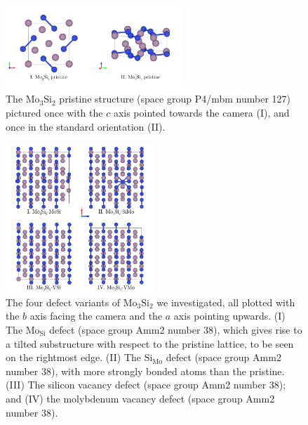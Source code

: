 \documentclass[7.5pt]{article}
\theoremstyle{plain}
\theoremstyle{definition}
\newcommand{\<}{\langle}
\renewcommand{\>}{\rangle}
\begin{document}
\begin{figure}
\label{fig:mat-pristine}
\centering
\includegraphics[width=0.6\textwidth]{img/Mo3Si2-pristine}
\caption{The $\text{Mo}_3\text{Si}_2$ pristine structure (space group P4/mbm number 127) pictured once with the $c$ axis pointed towards the camera (I), and once in the standard orientation (II).}
\end{figure}

\begin{figure}
\label{fig:mo3si2-defects-b}
\centering
\includegraphics[width=0.5\textwidth]{img/Mo3Si2-defects-b}
\caption{The four defect variants of $\text{Mo}_3\text{Si}_2$ we investigated, all plotted with the $b$ axis facing the camera and the $a$ axis pointing upwards. (I) The $\text{Mo}_{\text{Si}}$ defect (space group Amm2 number 38), which gives rise to a tilted substructure with respect to the pristine lattice, to be seen on the rightmost edge. (II) The $\text{Si}_{\text{Mo}}$ defect (space group Amm2 number 38), with more strongly bonded atoms than the pristine. (III) The silicon vacancy defect (space group Amm2 number 38); and (IV) the molybdenum vacancy defect (space group Amm2 number 38).}
\end{figure}
\end{document}
